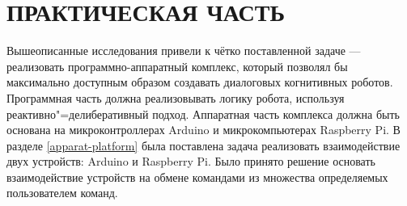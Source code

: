 \clearpage
\chapter{ПРАКТИЧЕСКАЯ ЧАСТЬ}

Вышеописанные исследования привели к чётко поставленной задаче --- реализовать программно-аппаратный комплекс, который позволял бы максимально доступным образом создавать диалоговых когнитивных роботов. Программная часть должна реализовывать логику робота, используя реактивно"=делиберативный подход. Аппаратная часть комплекса должна быть основана на микроконтроллерах Arduino и микрокомпьютерах Raspberry Pi. В разделе \ref{apparat-platform} была поставлена задача реализовать взаимодействие двух устройств: Arduino и Raspberry Pi. Было принято решение основать взаимодействие устройств на обмене командами из множества определяемых пользователем команд.

